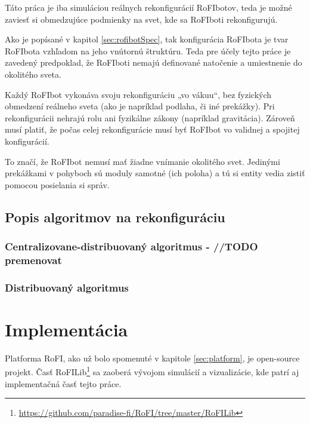 \documentclass[
  digital, %
  oneside, %
  table,   %
  lof,     %
  nolot,     %
]{fithesis3}
\begin{document}
Táto práca je iba simuláciou reálnych rekonfigurácií RoFIbotov, teda je možné zaviesť si obmedzujúce podmienky na svet, kde sa RoFIboti rekonfigurujú. 

Ako je popísané v kapitol \ref{sec:rofibotSpec}, tak konfigurácia RoFIbota je tvar RoFIbota vzhľadom na jeho vnútornú štruktúru. Teda pre účely tejto práce je zavedený predpoklad, že RoFIboti nemajú definované natočenie a umiestnenie do okolitého sveta. 

Každý RoFIbot vykonáva svoju rekonfiguráciu „vo vákuu“, bez fyzických obmedzení reálneho sveta (ako je napríklad podlaha, či iné prekážky). Pri rekonfigurácii nehrajú rolu ani fyzikálne zákony (napríklad gravitácia). Zároveň musí platiť, že počas celej rekonfigurácie musí byť RoFIbot vo validnej a spojitej konfigurácií. 

To značí, že RoFIbot nemusí mať žiadne vnímanie okolitého svet. Jedinými prekážkami v pohyboch sú moduly samotné (ich poloha) a tú si entity vedia zistiť pomocou posielania si správ. 

\section{Popis algoritmov na rekonfiguráciu}
\label{sec:algoDesc}
\subsection{Centralizovane-distribuovaný algoritmus - //TODO premenovat}
\subsection{Distribuovaný algoritmus}





\chapter{Implementácia}
\label{sec:implementation}
Platforma RoFI, ako už bolo spomenuté v kapitole \ref{sec:platform}, je open-source projekt. Časť RoFILib\footnote{\url{https://github.com/paradise-fi/RoFI/tree/master/RoFILib}} sa zaoberá vývojom simulácií a vizualizácie, kde patrí aj implementačná časť tejto práce. 
\end{document}
